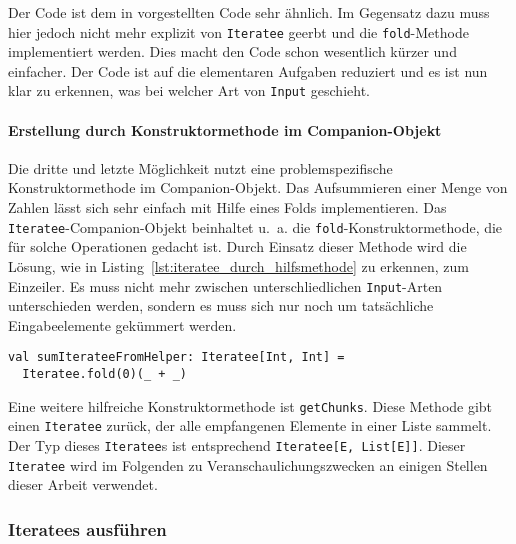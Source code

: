 Der Code ist dem in  vorgestellten Code sehr ähnlich.
Im Gegensatz dazu muss hier jedoch nicht mehr explizit von \lstinline|Iteratee| geerbt und die \lstinline|fold|-Methode implementiert werden.
Dies macht den Code schon wesentlich kürzer und einfacher.
Der Code ist auf die elementaren Aufgaben reduziert und es ist nun klar zu erkennen, was bei welcher Art von \lstinline|Input| geschieht.


\paragraph{Erstellung durch Konstruktormethode im Companion-Objekt} %
\label{par:erstellung_durch_konstruktormethode_im_companion_objekt}\mbox{} %

Die dritte und letzte Möglichkeit nutzt eine problemspezifische Konstruktormethode im Companion-Objekt.
Das Aufsummieren einer Menge von Zahlen lässt sich sehr einfach mit Hilfe eines Folds implementieren.
Das \lstinline|Iteratee|-Companion-Objekt beinhaltet u.~a. die \lstinline|fold|-Konstruktormethode, die für solche Operationen gedacht ist.
Durch Einsatz dieser Methode wird die Lösung, wie in Listing~\ref{lst:iteratee_durch_hilfsmethode} zu erkennen, zum Einzeiler.
Es muss nicht mehr zwischen unterschliedlichen \lstinline|Input|-Arten unterschieden werden, sondern es muss sich nur noch um tatsächliche Eingabeelemente gekümmert werden.

\begin{lstlisting}[caption=Erstellung eines Iteratees durch Konstruktormethode im Companion-Objekt, label=lst:iteratee_durch_hilfsmethode]
val sumIterateeFromHelper: Iteratee[Int, Int] =
  Iteratee.fold(0)(_ + _)
\end{lstlisting}

Eine weitere hilfreiche Konstruktormethode ist \lstinline|getChunks|.
Diese Methode gibt einen \lstinline|Iteratee| zurück, der alle empfangenen Elemente in einer Liste sammelt.
Der Typ dieses \lstinline|Iteratee|s ist entsprechend \lstinline|Iteratee[E, List[E]]|.
Dieser \lstinline|Iteratee| wird im Folgenden zu Veranschaulichungszwecken an einigen Stellen dieser Arbeit verwendet.



\subsubsection{Iteratees ausführen} %
\label{ssub:iteratees_ausfuehren}

